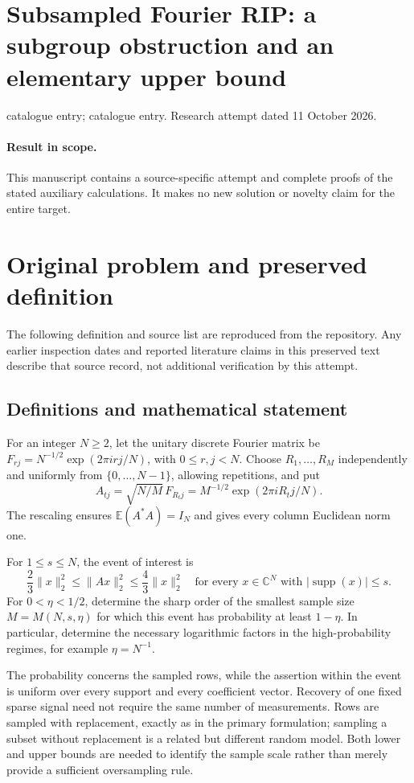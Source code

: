 \documentclass[11pt]{article}
\begin{document}
\section*{Subsampled Fourier RIP: a subgroup obstruction and an elementary upper bound}
\noindent catalogue entry; catalogue entry. Research attempt dated 11 October 2026.
\paragraph{Result in scope.}This manuscript contains a source-specific attempt and complete proofs of the stated auxiliary calculations. It makes no new solution or novelty claim for the entire target.
\section{Original problem and preserved definition}
The following definition and source list are reproduced from the repository. Any earlier inspection dates and reported literature claims in this preserved text describe that source record, not additional verification by this attempt.
\subsection{Definitions and mathematical statement}
For an integer $N\ge2$, let the unitary discrete Fourier matrix be
$F_{rj}=N^{-1/2}\exp(2\pi i rj/N)$, with $0\le r,j<N$.
Choose $R_1,\ldots,R_M$ independently and uniformly from
$\{0,\ldots,N-1\}$, allowing repetitions, and put
\[
 A_{tj}=\sqrt{N/M}\,F_{R_tj}
       =M^{-1/2}\exp(2\pi i R_tj/N).
\]
The rescaling ensures $\mathbb E(A^*A)=I_N$ and gives every column
Euclidean norm one.

For $1\le s\le N$, the event of interest is
\[
 \frac23\|x\|_2^2\le\|Ax\|_2^2\le\frac43\|x\|_2^2
 \quad\text{for every }x\in\mathbb C^N
       \text{ with }|\operatorname{supp}(x)|\le s.
\]
For $0<\eta<1/2$, determine the sharp order of the smallest sample
size $M=M(N,s,\eta)$ for which this event has probability at least
$1-\eta$. In particular, determine the necessary logarithmic factors
in the high-probability regimes, for example $\eta=N^{-1}$.

The probability concerns the sampled rows, while the assertion within
the event is uniform over every support and every coefficient vector.
Recovery of one fixed sparse signal need not require the same number
of measurements. Rows are sampled with replacement, exactly as in
the primary formulation; sampling a subset without replacement is a
related but different random model. Both lower and upper bounds are
needed to identify the sample scale rather than merely provide a
sufficient oversampling rule.
\end{document}
